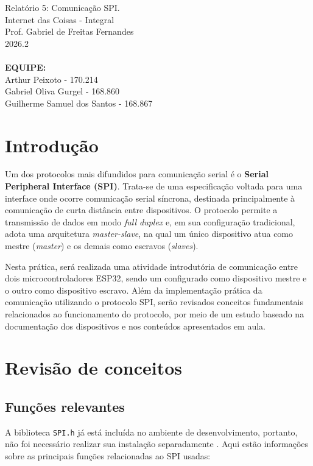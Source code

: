 \documentclass[a4paper,oneside,10pt]{article}
\begin{document}
\noindent Relatório 5: Comunicação SPI. \\
Internet das Coisas - Integral\\
Prof. Gabriel de Freitas Fernandes\\
2026.2\\
\\
\textbf{EQUIPE:} \\ Arthur Peixoto - 170.214 \\ Gabriel Oliva Gurgel - 168.860 \\ Guilherme Samuel dos Santos - 168.867

\section{Introdução}
Um dos protocolos mais difundidos para comunicação serial é o \textbf{Serial Peripheral Interface (SPI)}. Trata-se de uma especificação voltada para uma interface onde ocorre comunicação serial síncrona, destinada principalmente à comunicação de curta distância entre dispositivos. O protocolo permite a transmissão de dados em modo \textit{full duplex} e, em sua configuração tradicional, adota uma arquitetura \textit{master-slave}, na qual um único dispositivo atua como mestre (\textit{master}) e os demais como escravos (\textit{slaves}).

Nesta prática, será realizada uma atividade introdutória de comunicação entre dois microcontroladores ESP32, sendo um configurado como dispositivo mestre e o outro como dispositivo escravo. Além da implementação prática da comunicação utilizando o protocolo SPI, serão revisados conceitos fundamentais relacionados ao funcionamento do protocolo, por meio de um estudo baseado na documentação dos dispositivos e nos conteúdos apresentados em aula.
\section{Revisão de conceitos}

\subsection{Funções relevantes}
A biblioteca \texttt{SPI.h} já está incluída no ambiente de desenvolvimento, portanto, não foi necessário realizar sua instalação separadamente \cite{arduino}. Aqui estão informações sobre as principais funções relacionadas ao SPI usadas:
\end{document}
